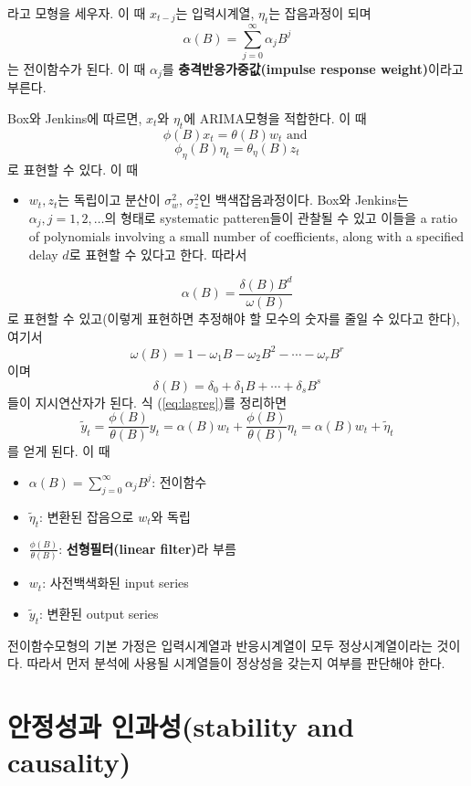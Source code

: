 \documentclass[b5paper,]{scrbook}
\providecommand{\tightlist}{%
  \setlength{\itemsep}{0pt}\setlength{\parskip}{0pt}}
\theoremstyle{plain}
\theoremstyle{definition}
\numberwithin{equation}{section}
\begin{document}
라고 모형을 세우자. 이 때 \(x_{t-j}\)는 입력시계열, \(\eta_{t}\)는 잡음과정이 되며
\[\alpha(B)=\sum_{j=0}^{\infty}\alpha_{j}B^{j}\]
는 전이함수가 된다. 이 때 \(\alpha_{j}\)를 \textbf{충격반응가중값(impulse response weight)}이라고 부른다.

Box와 Jenkins에 따르면, \(x_{t}\)와 \(\eta_{t}\)에 ARIMA모형을 적합한다. 이 때
\[\phi(B)x_{t}=\theta(B)w_{t} \text{ and }\]
\[\phi_{\eta}(B)\eta_{t}=\theta_{\eta}(B)z_{t}\]
로 표현할 수 있다. 이 때

\begin{itemize}
\tightlist
\item
  \(w_{t},z_{t}\)는 독립이고 분산이 \(\sigma_{w}^{2}\), \(\sigma_{z}^{2}\)인 백색잡음과정이다. Box와 Jenkins는 \(\alpha_{j}, j=1,2,\ldots\)의 형태로 systematic patteren들이 관찰될 수 있고 이들을 a ratio of polynomials involving a small number of coefficients, along with a specified delay \(d\)로 표현할 수 있다고 한다. 따라서
\end{itemize}

\[\alpha(B)=\frac{\delta (B)B^{d}}{\omega(B)}\]
로 표현할 수 있고(이렇게 표현하면 추정해야 할 모수의 숫자를 줄일 수 있다고 한다), 여기서
\[\omega(B)=1-\omega_{1}B-\omega_{2}B^{2}-\cdots -\omega_{r}B^{r}\]
이며
\[\delta(B)=\delta_{0}+\delta_{1}B+\cdots +\delta_{s}B^{s}\]
들이 지시연산자가 된다. 식 (\eqref{eq:lagreg})를 정리하면
\[\tilde{y}_{t}=\frac{\phi(B)}{\theta(B)}y_{t}=\alpha(B)w_{t}+\frac{\phi(B)}{\theta(B)}\eta_{t}=\alpha(B)w_{t}+\tilde{\eta}_{t}\]
를 얻게 된다. 이 때

\begin{itemize}
\item
  \(\alpha(B)=\sum_{j=0}^{\infty}\alpha_{j}B^{j}\): 전이함수
\item
  \(\tilde{\eta}_{t}\): 변환된 잡음으로 \(w_{t}\)와 독립
\item
  \(\frac{\phi(B)}{\theta(B)}\): \textbf{선형필터(linear filter)}라 부름
\item
  \(w_{t}\): 사전백색화된 input series
\item
  \(\tilde{y}_{t}\): 변환된 output series
\end{itemize}

전이함수모형의 기본 가정은 입력시계열과 반응시계열이 모두 정상시계열이라는 것이다. 따라서 먼저 분석에 사용될 시계열들이 정상성을 갖는지 여부를 판단해야 한다.

\hypertarget{-stability-and-causality}{%
\section{안정성과 인과성(stability and causality)}\label{-stability-and-causality}}
\end{document}
